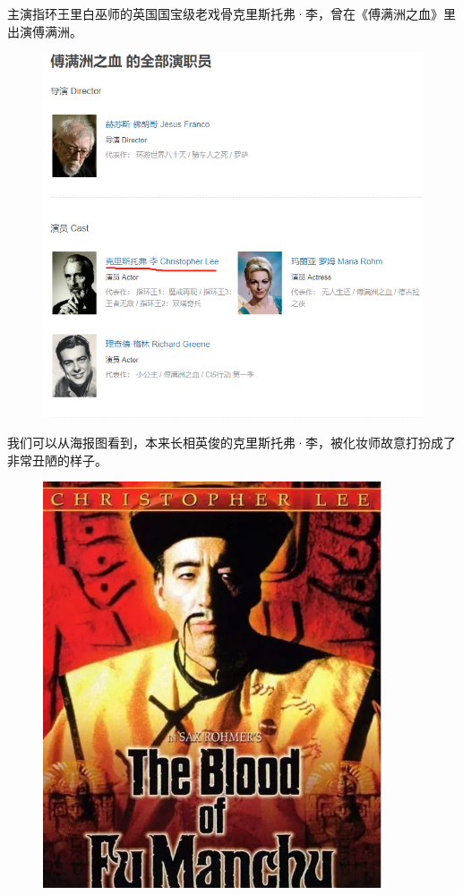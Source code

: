 \documentclass[UTF8, 11pt, oneside]{ctexart}
\begin{document}
主演指环王里白巫师的英国国宝级老戏骨克里斯托弗·李，曾在《傅满洲之血》里出演傅满洲。

\begin{figure}[H]
    \centering
    \includegraphics[width=12cm]{2023-09-06-006}
\end{figure}


我们可以从海报图看到，本来长相英俊的克里斯托弗·李，被化妆师故意打扮成了非常丑陋的样子。

\begin{figure}[H]
    \centering
    \includegraphics[width=10cm]{2023-09-06-007}
\end{figure}
\end{document}
